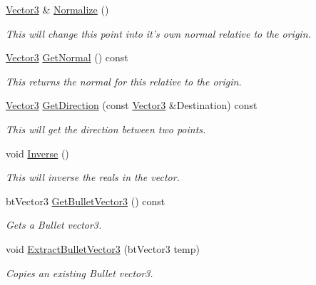\begin{DoxyCompactItemize}
\hyperlink{classphys_1_1Vector3}{Vector3} \& \hyperlink{classphys_1_1Vector3_a28d3cdf9457a14be4db6dfce584796c0}{Normalize} ()
\begin{DoxyCompactList}\small\item\em This will change this point into it's own normal relative to the origin. \item\end{DoxyCompactList}\item 
\hyperlink{classphys_1_1Vector3}{Vector3} \hyperlink{classphys_1_1Vector3_a81e11f45378758391c97ec55b519951c}{GetNormal} () const 
\begin{DoxyCompactList}\small\item\em This returns the normal for this relative to the origin. \item\end{DoxyCompactList}\item 
\hyperlink{classphys_1_1Vector3}{Vector3} \hyperlink{classphys_1_1Vector3_a63cd464cdd9ba976ac112fdf8bb620be}{GetDirection} (const \hyperlink{classphys_1_1Vector3}{Vector3} \&Destination) const 
\begin{DoxyCompactList}\small\item\em This will get the direction between two points. \item\end{DoxyCompactList}\item 
void \hyperlink{classphys_1_1Vector3_a30af9c8ae51596fa00fa7f350f9668f5}{Inverse} ()
\begin{DoxyCompactList}\small\item\em This will inverse the reals in the vector. \item\end{DoxyCompactList}\item 
btVector3 \hyperlink{classphys_1_1Vector3_adf4129007ee41f5a03e97502f2df9c41}{GetBulletVector3} () const 
\begin{DoxyCompactList}\small\item\em Gets a Bullet vector3. \item\end{DoxyCompactList}\item 
void \hyperlink{classphys_1_1Vector3_a24ae86b068340be6727877f8c6c1a313}{ExtractBulletVector3} (btVector3 temp)
\begin{DoxyCompactList}\small\item\em Copies an existing Bullet vector3. \item\end{DoxyCompactList}\item 

\end{DoxyCompactItemize}
